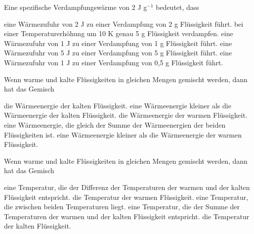 \documentclass[11pt]{exam}
\begin{document}
\setlength{\voffset}{-0.5in}
\setlength{\headsep}{5pt}

\hspace{2mm}
 \hspace{5mm}
\vspace{4mm}

\begin{questions}

\question Eine spezifische Verdampfungswärme von 2 J g\(^{-1}\) bedeutet, dass

\begin{choices}
	\choice eine Wärmezufuhr von 2 J zu einer Verdampfung von 2 g Flüssigkeit führt.
	\choice bei einer Temperaturerhöhung um 10 K genau 5 g Flüssigkeit verdampfen.
	\choice eine Wärmezufuhr von 1 J zu einer Verdampfung von 1 g Flüssigkeit führt.
	\choice eine Wärmezufuhr von 5 J zu einer Verdampfung von 5 g Flüssigkeit führt.
	\choice eine Wärmezufuhr von 1 J zu einer Verdampfung von 0,5 g Flüssigkeit führt.
\end{choices}

\vspace{3mm}\question Wenn warme und kalte Flüssigkeiten in gleichen Mengen gemischt werden, dann hat das Gemisch

\begin{choices}
	\choice die Wärmeenergie der kalten Flüssigkeit.
	\choice eine Wärmeenergie kleiner als die Wärmeenergie der kalten Flüssigkeit.
	\choice die Wärmeenergie der warmen Flüssigkeit.
	\choice eine Wärmeenergie, die gleich der Summe der Wärmeenergien der beiden Flüssigkeiten ist.
	\choice eine Wärmeenergie kleiner als die Wärmeenergie der warmen Flüssigkeit.
\end{choices}

\vspace{3mm}\question Wenn warme und kalte Flüssigkeiten in gleichen Mengen gemischt werden, dann hat das Gemisch

\begin{choices}
	\choice eine Temperatur, die der Differenz der Temperaturen der warmen und der kalten Flüssigkeit entspricht.
	\choice die Temperatur der warmen Flüssigkeit.
	\choice eine Temperatur, die zwischen beiden Temperaturen liegt.
	\choice eine Temperatur, die der Summe der Temperaturen der warmen und der kalten Flüssigkeit entspricht.
	\choice die Temperatur der kalten Flüssigkeit.
\end{choices}


\end{questions}
\end{document}
